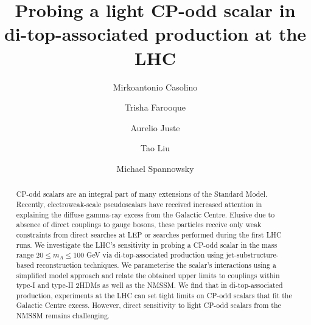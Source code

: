 \documentclass[preprintnumbers,superscriptaddress,nofootinbib,aps,prd,floatfix]{revtex4}
\begin{document}
\title{Probing a light CP-odd scalar in di-top-associated production at the LHC}

\begin{abstract}
\noindent 
CP-odd scalars are an integral part of many extensions of the Standard Model. Recently, electroweak-scale pseudoscalars have received increased attention in explaining the diffuse gamma-ray excess from the Galactic Centre.
Elusive due to absence of direct couplings to gauge bosons, these particles receive only weak constraints from direct searches at LEP or searches performed during the first LHC runs. We investigate the LHC's sensitivity in probing a CP-odd scalar in the mass range $20 \leq m_A \leq 100$ GeV via di-top-associated production  using jet-substructure-based reconstruction techniques. We parameterise the scalar's interactions using a simplified model approach and relate the 
obtained upper limits to couplings within type-I and type-II 2HDMs as well as the NMSSM. We find that in di-top-associated production, experiments at the LHC can set tight limits on CP-odd scalars that fit the Galactic Centre excess.  However, direct sensitivity to light CP-odd scalars from the NMSSM remains challenging.  
\end{abstract}

\author{Mirkoantonio Casolino}

\author{Trisha Farooque}

\author{Aurelio Juste}

\author{Tao Liu}
%
\author{Michael Spannowsky}
%

\pacs{}


\maketitle
\end{document}
